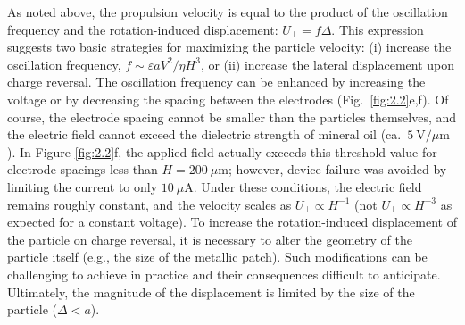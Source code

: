 As noted above, the propulsion velocity is equal to the product of the oscillation frequency and the rotation-induced displacement: $U_{\perp}=f\Delta$.
This expression suggests two basic strategies for maximizing the particle velocity: (i) increase the oscillation frequency, $f\sim\varepsilon a V^2/\eta H^3$, or (ii) increase the lateral displacement upon charge reversal.
The oscillation frequency can be enhanced by increasing the voltage or by decreasing the spacing between the electrodes (Fig.~\ref{fig:2.2}e,f).
Of course, the electrode spacing cannot be smaller than the particles themselves, and the electric field cannot exceed the dielectric strength of mineral oil (ca.~$5~\text{V/}\mu\text{m}$).
In Figure \ref{fig:2.2}f, the applied field actually exceeds this threshold value for electrode spacings less than $H=200~\mu\text{m}$; however, device failure was avoided by limiting the current to only $10~\mu\text{A}$.
Under these conditions, the electric field remains roughly constant, and the velocity scales as $U_{\perp}\propto H^{-1}$ (not $U_{\perp}\propto H^{-3}$ as expected for a constant voltage). 
To increase the rotation-induced displacement of the particle on charge reversal, it is necessary to alter the geometry of the particle itself (e.g., the size of the metallic patch). 
Such modifications can be challenging to achieve in practice and their consequences difficult to anticipate. 
Ultimately, the magnitude of the displacement is limited by the size of the particle ($\Delta < a$).

